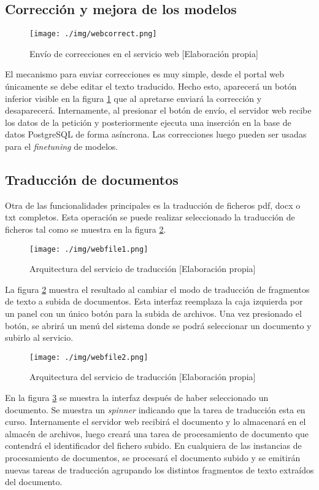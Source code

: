 \subsection{Corrección y mejora de los modelos}
\begin{figure}[H]
    \centering
    \texttt{[image: ./img/webcorrect.png]}
    \caption{Envío de correcciones en el servicio web [Elaboración propia]}\label{webcorrect}
\end{figure}
El mecanismo para enviar correcciones es muy simple, desde el portal web únicamente se debe editar el texto traducido. Hecho esto, aparecerá un botón inferior visible en la figura \ref{webcorrect} que al apretarse enviará la corrección y desaparecerá.
Internamente, al presionar el botón de envío, el servidor web recibe los datos de la petición y posteriormente ejecuta una inserción en la base de datos PostgreSQL de forma asíncrona.
Las correcciones luego pueden ser usadas para el \textit{finetuning} de modelos.

\subsection{Traducción de documentos}
Otra de las funcionalidades principales es la traducción de ficheros pdf, docx o txt completos. Esta operación se puede realizar seleccionado la traducción de ficheros tal como se muestra en la figura \ref{webfile1}.
\begin{figure}[H]
    \centering
    \texttt{[image: ./img/webfile1.png]}
    \caption{Arquitectura del servicio de traducción [Elaboración propia]}\label{webfile1}
\end{figure}

La figura \ref{webfile1} muestra el resultado al cambiar el modo de traducción de fragmentos de texto a subida de documentos. Esta interfaz reemplaza la caja izquierda por un panel con un único botón para la subida de archivos.
Una vez presionado el botón, se abrirá un menú del sistema donde se podrá seleccionar un documento y subirlo al servicio.

\begin{figure}[H]
    \centering
    \texttt{[image: ./img/webfile2.png]}
    \caption{Arquitectura del servicio de traducción [Elaboración propia]}\label{webfile2}
\end{figure}

En la figura \ref{webfile2} se muestra la interfaz después de haber seleccionado un documento. Se muestra un \textit{spinner} indicando que la tarea de traducción esta en curso. Internamente el servidor web recibirá el documento y lo almacenará en el almacén de archivos, luego creará una tarea de procesamiento de documento que contendrá el identificador del fichero subido. En cualquiera de las instancias de procesamiento de documentos, se procesará el documento subido y se emitirán nuevas tareas de traducción agrupando los distintos fragmentos de texto extraídos del documento.

